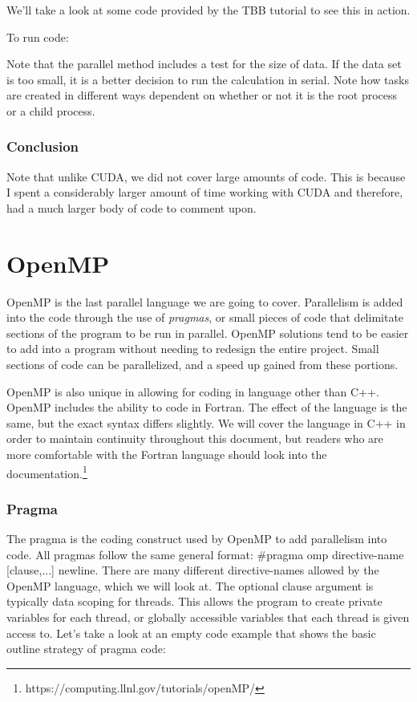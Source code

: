 \documentclass{article}
\newcommand{\comp}[1]{{\ttfamily #1}}
\begin{document}
  We'll take a look at some code provided by the TBB tutorial to see this in action.

  

  To run code:

  

  Note that the parallel method includes a test for the size of data. If the data set is too small, it is a better decision to run the calculation in serial. Note how tasks are created in different ways dependent on whether or not it is the root process or a child process.

  \section{Conclusion}
  Note that unlike CUDA, we did not cover large amounts of code. This is because I spent a considerably larger amount of time working with CUDA and therefore, had a much larger body of code to comment upon.

\part{OpenMP}
OpenMP is the last parallel language we are going to cover. Parallelism is added into the code through the use of \emph{pragmas}, or small pieces of code that delimitate sections of the program to be run in parallel. OpenMP solutions tend to be easier to add into a program without needing to redesign the entire project. Small sections of code can be parallelized, and a speed up gained from these portions.

OpenMP is also unique in allowing for coding in language other than C++. OpenMP includes the ability to code in Fortran. The effect of the language is the same, but the exact syntax differs slightly. We will cover the language in C++ in order to maintain continuity throughout this document, but readers who are more comfortable with the Fortran language should look into the documentation.\footnote{\comp{https://computing.llnl.gov/tutorials/openMP/}}
	\section{Pragma}
	The pragma is the coding construct used by OpenMP to add parallelism into code. All pragmas follow the same general format: \comp{\#pragma omp directive-name [clause,...] newline}. There are many different \comp{directive-name}s allowed by the OpenMP language, which we will look at. The optional \comp{clause} argument is typically data scoping for threads. This allows the program to create private variables for each thread, or globally accessible variables that each thread is given access to. Let's take a look at an empty code example that shows the basic outline strategy of pragma code:
	
\end{document}
